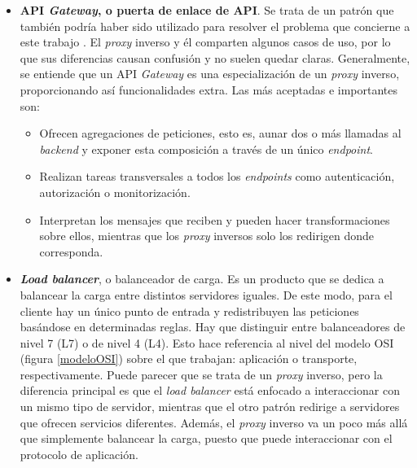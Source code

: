 \documentclass[11pt,spanish,listoffigures]{tfgetsinf}
\begin{document}
\begin{itemize}

	\item \textbf{API \emph{Gateway}, o puerta de enlace de API}. Se trata de un patrón que también podría haber sido utilizado para resolver el problema que concierne a este trabajo \cite{ApiGateway}. El \emph{proxy} inverso y él comparten algunos casos de uso, por lo que sus diferencias causan confusión y no suelen quedar claras. Generalmente, se entiende que un API \emph{Gateway} es una especialización de un \emph{proxy} inverso, proporcionando así funcionalidades extra. Las más aceptadas e importantes son:

	\begin{itemize}
	
		\item Ofrecen agregaciones de peticiones, esto es, aunar dos o más llamadas al \emph{backend} y exponer esta composición a través de un único \emph{endpoint}.
	
		\item Realizan tareas transversales a todos los \emph{endpoints} como autenticación, autorización o monitorización.

		\item Interpretan los mensajes que reciben y pueden hacer transformaciones sobre ellos, mientras que los \emph{proxy} inversos solo los redirigen donde corresponda.

	\end{itemize}

	\item \textbf{\emph{Load balancer}}, o balanceador de carga. Es un producto que se dedica a balancear la carga entre distintos servidores iguales. De este modo, para el cliente hay un único punto de entrada y redistribuyen las peticiones basándose en determinadas reglas. Hay que distinguir entre balanceadores de nivel 7 (L7) o de nivel 4 (L4). Esto hace referencia al nivel del modelo OSI (figura \ref{modeloOSI}) sobre el que trabajan: aplicación o transporte, respectivamente. Puede parecer que se trata de un \emph{proxy} inverso, pero la diferencia principal es que el \emph{load balancer} está enfocado a interaccionar con un mismo tipo de servidor, mientras que el otro patrón redirige a servidores que ofrecen servicios diferentes. Además, el \emph{proxy} inverso va un poco más allá que simplemente balancear la carga, puesto que puede interaccionar con el protocolo de aplicación.


\end{itemize}
\end{document}
